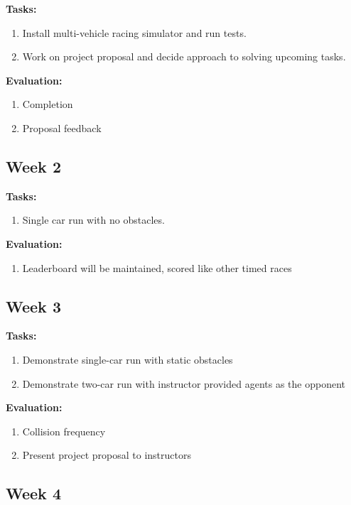 \documentclass[letta4 paper]{article}
\numberwithin{equation}{section}
\newcommand{\0}{\mathbf{0}}
\begin{document}
	\textbf{Tasks: } \begin{enumerate}
		\item Install multi-vehicle racing simulator and run tests.
		\item Work on project proposal and decide approach to solving upcoming tasks.
	\end{enumerate}

	\noindent\textbf{Evaluation: } \begin{enumerate}
		\item Completion
		\item Proposal feedback
	\end{enumerate}

	\subsection{Week 2}
	
	\textbf{Tasks: } \begin{enumerate}
		\item Single car run with no obstacles.
	\end{enumerate}
	
	\noindent\textbf{Evaluation: } \begin{enumerate}
		\item Leaderboard will be maintained, scored like other timed races
	\end{enumerate}
	
	\subsection{Week 3}
	
	\textbf{Tasks: } \begin{enumerate}
		\item Demonstrate single-car run with static obstacles
		\item Demonstrate two-car run with instructor provided agents as the opponent
	\end{enumerate}
	
	\noindent\textbf{Evaluation: } \begin{enumerate}
		\item Collision frequency
		\item Present project proposal to instructors
	\end{enumerate}

	
	\subsection{Week 4}
	
\end{document}
